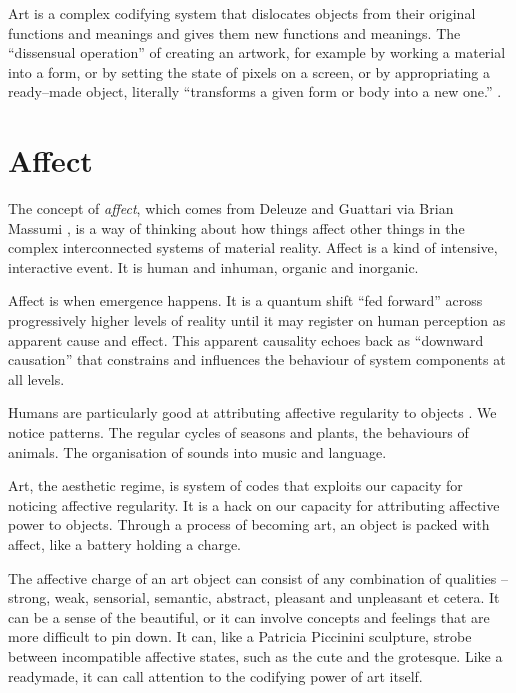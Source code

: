 \documentclass[letter:wpaper]{article}
\begin{document}
    Art is a complex codifying system that dislocates objects from their original functions and meanings and gives them new functions and meanings. The ``dissensual operation'' of creating an artwork, for example by working a material into a form, or by setting the state of pixels on a screen, or by appropriating a ready–made object, literally ``transforms a given form or body into a new one.'' \citep[p.54]{RancierThEmncptdSpcttr2009}.

\section{Affect}

    The concept of \emph{affect}, which comes from Deleuze and Guattari via Brian Massumi \citep{MassumiTheAtnmyOfAffct1995}, is a way of thinking about how things affect other things in the complex interconnected systems of material reality. Affect is a kind of intensive, interactive event. It is human and inhuman, organic and inorganic.

    Affect is when emergence happens. It is a quantum shift ``fed forward'' across progressively higher levels of reality \citep[p.37]{MassumiPrblsFrThVrtl2002} until it may register on human perception as apparent cause and effect. This apparent causality echoes back as ``downward causation'' \citep[p.?]{FlackCrsGrnng2017} that constrains and influences the behaviour of system components at all levels.
    
    Humans are particularly good at attributing affective regularity to objects \citep{FristonThFrEnrgPrncpl2010} \citep{DeaconTheSymbolicSpecies1998}. We notice patterns. The regular cycles of seasons and plants, the behaviours of animals. The organisation of sounds into music and language.
    
    Art, the aesthetic regime, is system of codes that exploits our capacity for noticing affective regularity. It is a hack on our capacity for attributing affective power to objects. Through a process of becoming art, an object is packed with affect, like a battery holding a charge. 
    
    The affective charge of an art object can consist of any combination of qualities – strong, weak, sensorial, semantic, abstract, pleasant and unpleasant et cetera. It can be a sense of the beautiful, or it can involve concepts and feelings that are more difficult to pin down. It can, like a Patricia Piccinini sculpture, strobe between incompatible affective states, such as the cute and the grotesque. Like a readymade, it can call attention to the codifying power of art itself.
\end{document}
